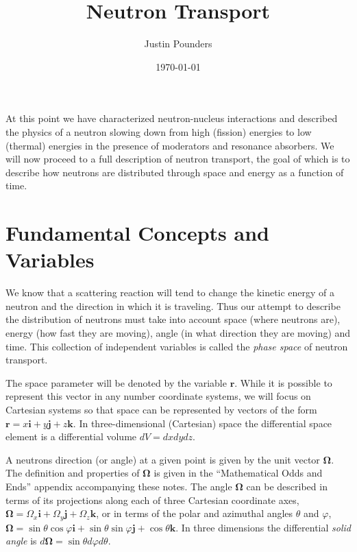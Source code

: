 \documentclass[11pt]{article}
\author{Justin Pounders}
\date{\today}
\title{Neutron Transport}
\renewcommand\vec{\mathbf}
\begin{document}
\maketitle
\tableofcontents

At this point we have characterized neutron-nucleus interactions and described the physics of a neutron slowing down from high (fission) energies to low (thermal) energies in the presence of moderators and resonance absorbers.  We will now proceed to a full description of neutron transport, the goal of which is to describe how neutrons are distributed through space and energy as a function of time.

\section{Fundamental Concepts and Variables}
\label{sec:orgheadline4}
We know that a scattering reaction will tend to change the kinetic energy of a neutron and the direction in which it is traveling.  Thus our attempt to describe the distribution of neutrons must take into account space (where neutrons are), energy (how fast they are moving), angle (in what direction they are moving) and time.  This collection of independent variables is called the \emph{phase space} of neutron transport.

The space parameter will be denoted by the variable \(\vec{r}\).  While it is possible to represent this vector in any number coordinate systems, we will focus on Cartesian systems so that space can be represented by vectors of the form \(\vec{r} = x\vec{i} + y\vec{j} + z \vec{k}\).  In three-dimensional (Cartesian) space the differential space element is a differential volume \(dV = dx dy dz\).

A neutrons direction (or angle) at a given point is given by the unit vector \(\vec{\Omega}\).  The definition and properties of \(\vec{\Omega}\) is given in the ``Mathematical Odds and Ends'' appendix accompanying these notes.  The angle \(\vec{\Omega}\) can be described in terms of its projections along each of three Cartesian coordinate axes, \(\vec{\Omega} = \Omega_x \vec{i} + \Omega_y \vec{j} + \Omega_z \vec{k}\), or in terms of the polar and azimuthal angles \(\theta\) and \(\varphi\), \(\vec{\Omega} = \sin\theta \cos\varphi \vec{i} + \sin\theta \sin\varphi \vec{j} + \cos\theta \vec{k}\).  In three dimensions the differential \emph{solid angle} is \(d\vec{\Omega} = \sin\theta d\varphi d\theta\).
\end{document}
